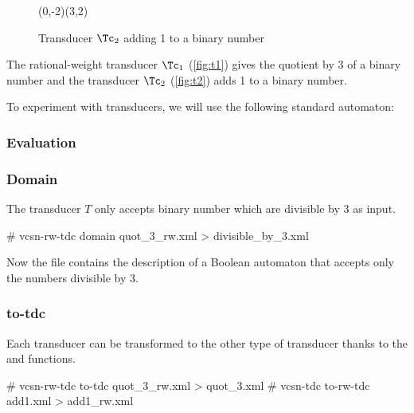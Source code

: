 \begin{figure}[tp]
  \begin{center}
    \begin{VCPicture}{(0,-2)(3,2)}
       
    \end{VCPicture}
    \caption{Transducer $\Tc_2$ adding 1 to a binary number}
    \label{fig:t2}
  \end{center}
\end{figure}

The rational-weight transducer
$\Tc_1$ (\autoref{fig:t1}) gives the
quotient by 3 of a binary number and the transducer
$\Tc_2$ (\autoref{fig:t2}) adds 1 to
a binary number.

\bigskip

To experiment with transducers, we will use the following standard
automaton:
\begin{center}
\end{center}


\subsubsection{Evaluation}


\subsubsection{Domain}
The transducer $T$ only accepts binary number which are divisible by 3
as input.
\begin{shell}
# vcsn-rw-tdc domain quot_3_rw.xml > divisible_by_3.xml
\end{shell}
Now the file  contains the description of a
Boolean automaton that accepts only the numbers divisible by 3.

\subsubsection{to-tdc}
Each transducer can be transformed to the other type of transducer
thanks to the  and  functions.
\begin{shell}
# vcsn-rw-tdc to-tdc quot_3_rw.xml > quot_3.xml
# vcsn-tdc to-rw-tdc add1.xml > add1_rw.xml
\end{shell}

